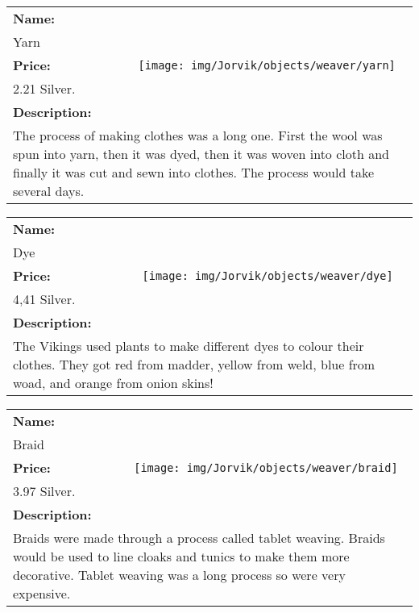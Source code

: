 \begin{table}[ht!]
	\centering
	\begin{tabular}{ p{3cm} c }\toprule
		\textbf{Name:} & \multirow{5}{*}{\texttt{[image: img/Jorvik/objects/weaver/yarn]}}\\
		Yarn & \\ 
		\textbf{Price:} & \\
		2.21 Silver. & \\ 
		\textbf{Description:} & \\
		\multicolumn{2}{p{12cm}}{The process of making clothes was a long one. First the wool was spun into yarn, then it was dyed, then it was woven into cloth and finally it was cut and sewn into clothes. The process would take several days.}\\
		\bottomrule
	\end{tabular}
\end{table}

\begin{table}[ht!]
	\centering
	\begin{tabular}{ p{3cm} c }\toprule
		\textbf{Name:} & \multirow{5}{*}{\texttt{[image: img/Jorvik/objects/weaver/dye]}}\\
		Dye & \\ 
		\textbf{Price:} & \\
		4,41 Silver. & \\ 
		\textbf{Description:} & \\
		\multicolumn{2}{p{12cm}}{The Vikings used plants to make different dyes to colour their clothes. They got red from madder, yellow from weld, blue from woad, and orange from onion skins!}\\
		\bottomrule
	\end{tabular}
\end{table}

\begin{table}[ht!]
	\centering
	\begin{tabular}{ p{3cm} c }\toprule
		\textbf{Name:} & \multirow{5}{*}{\texttt{[image: img/Jorvik/objects/weaver/braid]}}\\
		Braid & \\ 
		\textbf{Price:} & \\
		3.97 Silver. & \\ 
		\textbf{Description:} & \\
		\multicolumn{2}{p{12cm}}{Braids were made through a process called tablet weaving. Braids would be used to line cloaks and tunics to make them more decorative. Tablet weaving was a long process so were very expensive.}\\
		\bottomrule
	\end{tabular}
\end{table}